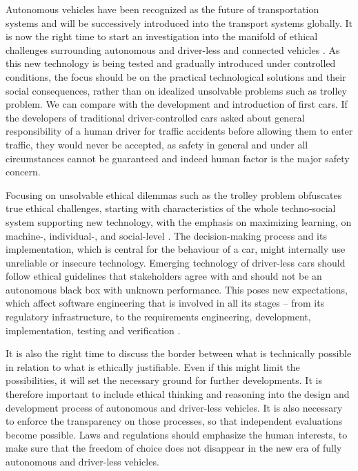 Autonomous vehicles have been recognized as the future of transportation systems \cite{EthicsCommission2017pr,Pillath2016,NHTSA2016PolicyUpdate} and will be successively introduced into the transport systems globally. It is now the right time to start an investigation into the manifold of ethical challenges surrounding autonomous and driver-less and connected vehicles \cite{EthicsCommission2017b}. As this new technology is being tested and gradually introduced under controlled conditions, the focus should be on the practical technological solutions and their social consequences, rather than on idealized unsolvable problems such as trolley problem. We can compare with the development and introduction of first cars. If the developers of traditional driver-controlled cars asked about general responsibility of a human driver for traffic accidents before allowing them to enter traffic, they would never be accepted, as safety in general and under all circumstances cannot be guaranteed and indeed human factor is the major safety concern. 

Focusing on unsolvable ethical dilemmas such as the trolley problem obfuscates true ethical challenges, starting with characteristics of the whole techno-social system supporting new technology, with the emphasis on maximizing learning, on machine-, individual-, and social-level \cite{DBLP:journals/corr/CharisiDFLMSSWY17}. The decision-making process and its implementation, which is central for the behaviour of a car, might internally use unreliable or insecure technology. Emerging technology of driver-less cars should follow ethical guidelines that stakeholders agree with and should not be an autonomous black box with unknown performance. This poses new expectations, which affect software engineering that is involved in all its stages – from its regulatory infrastructure, to the requirements engineering, development, implementation, testing and verification \cite{Greene2016_1514,MoralMachine2016,Mooney2016,Ackerman2016,DBLP:journals/corr/CharisiDFLMSSWY17}.

It is also the right time to discuss the border between what is technically possible in relation to what is ethically justifiable. Even if this might limit the possibilities, it will set the necessary ground for further developments. It is therefore important to include ethical thinking and reasoning into the design and development process of autonomous and driver-less vehicles. It is also necessary to enforce the transparency on those processes, so that independent evaluations become possible. Laws and regulations should emphasize the human interests, to make sure that the freedom of choice does not disappear in the new era of fully autonomous and driver-less vehicles. 


